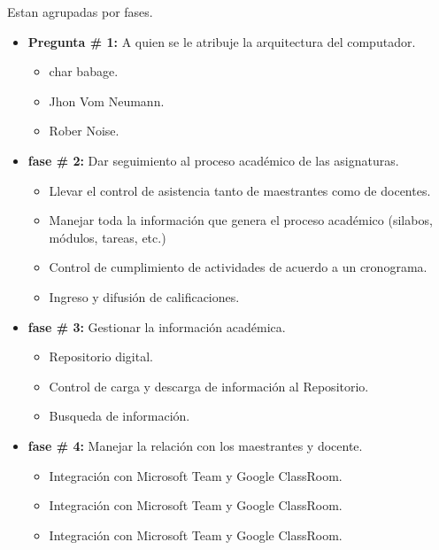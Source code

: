 \documentclass[a4paper,12pt,spanish]{article}
\begin{document}
\begin{tcolorbox}[skin=widget,
boxrule=1mm,
coltitle=black,
colframe=blue!45!white,colback=blue!15!white,width=(1\linewidth),before=\hfill,after=\hfill,adjusted title={\textbf{Preguntas para el autocontrol}}]
Estan agrupadas por fases.  
\tcblower

\begin{itemize}
\item \textbf{Pregunta \# 1:} A quien se le atribuje la arquitectura del computador.
  \begin{itemize}
  \item  char babage.
  \item Jhon Vom Neumann.
  \item Rober Noise.
  \end{itemize}
\item \textbf{fase \# 2:} Dar seguimiento al proceso académico de las asignaturas.
  \begin{itemize}
  \item Llevar el control de asistencia tanto de maestrantes como de docentes.
  \item Manejar toda la información que genera el proceso académico (silabos, módulos, tareas, etc.)
  \item Control de cumplimiento de actividades de acuerdo a un cronograma.
  \item Ingreso y difusión de calificaciones.
  \end{itemize}
\item \textbf{fase \# 3:} Gestionar la información académica.
  \begin{itemize}
  \item Repositorio digital.
  \item Control de carga y descarga de información al Repositorio.
  \item Busqueda de información. 
  \end{itemize}
\item \textbf{fase \# 4:} Manejar la relación con los maestrantes y docente.
  \begin{itemize}
  \item Integración con Microsoft Team y Google ClassRoom.
  \item Integración con Microsoft Team y Google ClassRoom.
  \item Integración con Microsoft Team y Google ClassRoom.
  \end{itemize}
\end{itemize}

\end{tcolorbox}
\end{document}
